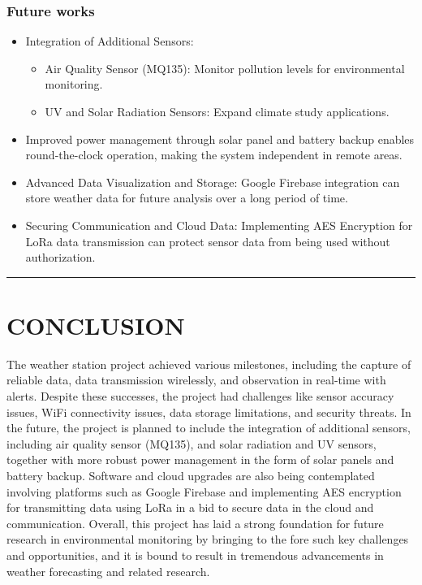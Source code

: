 \documentclass[conference, onecolumn]{IEEEtran}
\begin{document}
\subsubsection{\textbf{Future works}}
\begin{itemize}
    \item Integration of Additional Sensors:
        \begin{itemize}
            \item Air Quality Sensor (MQ135): Monitor pollution levels for environmental monitoring.
            \item UV and Solar Radiation Sensors: Expand climate study applications.
        \end{itemize}
    \item Improved power management through solar panel and battery backup enables round-the-clock operation, making the system independent in remote areas.
    \item Advanced Data Visualization and Storage: Google Firebase integration can store weather data for future analysis over a long period of time.
    \item Securing Communication and Cloud Data: Implementing AES Encryption for LoRa data transmission can protect sensor data from being used without authorization.
\end{itemize}

\vspace{10pt}
\noindent\rule{\textwidth}{0.4pt}
\vspace{10pt}

\section{CONCLUSION}
The weather station project achieved various milestones, including the capture of reliable data, data transmission wirelessly, and observation in real-time with alerts. Despite these successes, the project had challenges like sensor accuracy issues, WiFi connectivity issues, data storage limitations, and security threats. In the future, the project is planned to include the integration of additional sensors, including air quality sensor (MQ135), and solar radiation and UV sensors, together with more robust power management in the form of solar panels and battery backup. Software and cloud upgrades are also being contemplated involving platforms such as Google Firebase and implementing AES encryption for transmitting data using LoRa in a bid to secure data in the cloud and communication. Overall, this project has laid a strong foundation for future research in environmental monitoring by bringing to the fore such key challenges and opportunities, and it is bound to result in tremendous advancements in weather forecasting and related research.
\end{document}
